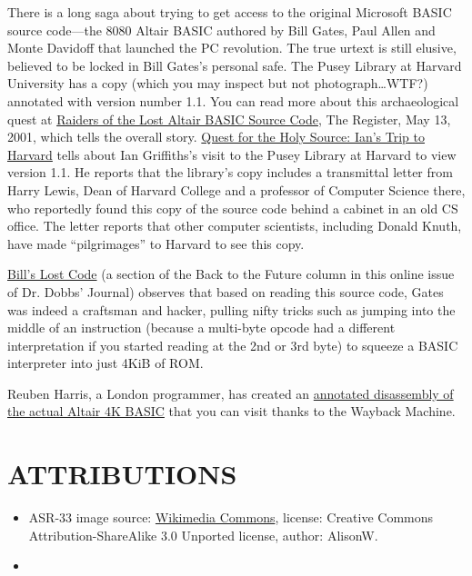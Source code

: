 \documentclass{article}
\begin{document}
There is a long saga about trying to get access to the original
Microsoft BASIC source code---the 8080 Altair BASIC authored by Bill
Gates, Paul Allen and Monte Davidoff that launched the PC revolution.
The true urtext is still elusive, believed to be locked in Bill Gates's
personal safe.
The Pusey Library at Harvard University has a copy (which you may
inspect but not photograph\ldots{}WTF?) annotated with version number
1.1.
You can read more about this archaeological quest at
\href{http://www.theregister.co.uk/2001/05/13/raiders_of_the_lost_altair/}{Raiders
of the Lost Altair BASIC Source Code}, The Register, May 13, 2001,
which tells the overall story.
\href{http://www.interact-sw.co.uk/altair/other\%20versions/ian.htm}{Quest
for the Holy Source: Ian's Trip to Harvard} tells about Ian
Griffiths's visit to the Pusey Library at Harvard to view version
1.1.
He reports that the library's copy includes a transmittal letter from
Harry Lewis, Dean of Harvard College and a professor of Computer
Science there, who reportedly found this copy of the source code behind
a cabinet in an old CS office.
The letter reports that other computer scientists, including Donald
Knuth, have made ``pilgrimages'' to Harvard to see this copy.

\href{http://www.drdobbs.com/back-to-the-future/184404733}{Bill's
  Lost Code} (a section of the Back to the Future column in this online
issue of Dr. Dobbs' Journal) observes that based on reading this source
code, Gates was indeed a craftsman and hacker, pulling nifty tricks such
as jumping into the middle of an instruction (because a multi-byte
opcode had a different interpretation if you started reading at the 2nd
or 3rd byte) to squeeze a BASIC interpreter into just 4KiB of ROM.

Reuben Harris, a London programmer, has created an
\href{http://web.archive.org/web/20011211233332/www.rjh.org.uk/altair/4k/index2.html}{annotated
disassembly of the actual Altair 4K BASIC} that you can visit thanks to the
Wayback Machine.


\section{ATTRIBUTIONS}

\begin{itemize}
\item ASR-33 image source:
  \href{http://en.wikipedia.org/wiki/File:Teletype_with_papertape_punch_and_reader.jpg}{Wikimedia
    Commons}, license: Creative Commons Attribution-ShareAlike 3.0
  Unported license, author: AlisonW.
\item 
\end{itemize}



\end{document}
